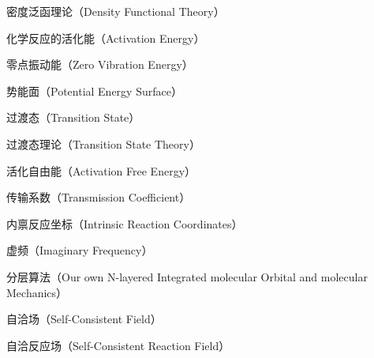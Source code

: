 \begin{denotation}[3cm]
  \item[DFT] 密度泛函理论（Density Functional Theory）
  \item[$E_a$] 化学反应的活化能（Activation Energy）
  \item[ZPE] 零点振动能（Zero Vibration Energy）
  \item[PES] 势能面（Potential Energy Surface）
  \item[TS] 过渡态（Transition State）
  \item[TST] 过渡态理论（Transition State Theory）
  \item[$\increment G^\neq$] 活化自由能（Activation Free Energy）
  \item[$\kappa$] 传输系数（Transmission Coefficient）
  \item[IRC] 内禀反应坐标（Intrinsic Reaction Coordinates）
  \item[$\nu_i$] 虚频（Imaginary Frequency）
  \item[ONIOM] 分层算法（Our own N-layered Integrated molecular Orbital and molecular Mechanics）
  \item[SCF] 自洽场（Self-Consistent Field）
  \item[SCRF] 自洽反应场（Self-Consistent Reaction Field）
  \fi
\end{denotation}





